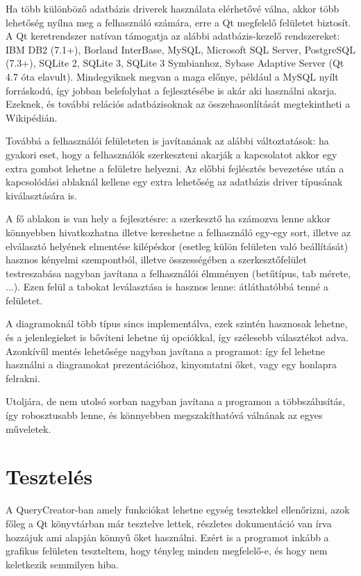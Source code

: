 Ha több különböző adatbázis driverek használata elérhetővé válna, akkor több lehetőség nyílna meg a felhasználó számára, erre a Qt megfelelő felületet biztosít. A Qt keretrendszer natívan támogatja az alábbi adatbázis-kezelő rendszereket: IBM DB2 (7.1+), Borland InterBase, MySQL, Microsoft SQL Server,	PostgreSQL (7.3+),	SQLite 2,	SQLite 3,	SQLite 3 Symbianhoz, Sybase Adaptive Server (Qt 4.7 óta elavult). Mindegyiknek megvan a maga előnye, például a MySQL nyílt forráskodú, így jobban belefolyhat a fejlesztésébe is akár aki használni akarja. Ezeknek, és további relációs adatbázisoknak az összehasonlítását megtekintheti a Wikipédián\cite{rdbmscompare}.

Továbbá a felhasználói felületeten is javítanának az alábbi változtatások: ha gyakori eset, hogy a felhasználók szerkeszteni akarják a kapcsolatot akkor egy extra gombot lehetne a felületre helyezni. Az előbbi fejlésztés bevezetése után a kapcsolódási ablaknál kellene egy extra lehetőség az adatbázis driver típusának kiválasztására is.

A fő ablakon is van hely a fejlesztésre: a szerkesztő ha számozva lenne akkor könnyebben hivatkozhatna illetve kereshetne a felhasználó egy-egy sort, illetve az elválasztó helyének elmentése kilépéskor (esetleg külön felületen való beállítását) hasznos kényelmi szempontból, illetve összességében a szerkesztőfelület testreszabása nagyban javítana a felhasználói élmményen (betűtípus, tab mérete, ...). Ezen felül a tabokat leválasztása is hasznos lenne: átláthatóbbá tenné a felületet.

A diagramoknál több típus sincs implementálva, ezek szintén hasznosak lehetne, és a jelenlegieket is bővíteni lehetne új opciókkal, így szélesebb választékot adva. Azonkívűl mentés lehetősége nagyban javítana a programot: így fel lehetne használni a diagramokat prezentációhoz, kinyomtatni őket, vagy egy honlapra felrakni.

Utoljára, de nem utolsó sorban nagyban javítana a programon a többszálusítás, így robosztusabb lenne, és könnyebben megszakíthatóvá válnának az egyes műveletek.

\section{Tesztelés}

A QueryCreator-ban amely funkciókat lehetne egység tesztekkel ellenőrizni, azok főleg a Qt könyvtárban már tesztelve lettek, részletes dokumentáció van írva hozzájuk ami alapján könnyű őket használni. Ezért is a programot inkább a grafikus felületen teszteltem, hogy tényleg minden megfelelő-e, és hogy nem keletkezik semmilyen hiba.

